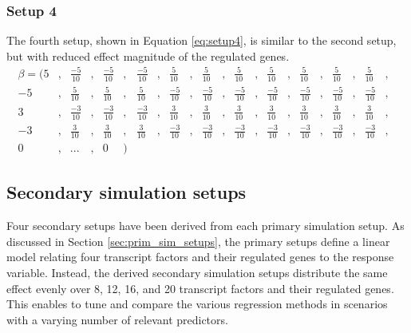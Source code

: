 \subsubsection{Setup 4}
The fourth setup, shown in Equation \ref{eq:setup4}, is similar to the second setup, but with reduced effect magnitude of the regulated genes. 
\begin{equation} \label{eq:setup4} 
\begin{aligned}
\beta = (	5&,& \frac{-5}{10}&,&  \frac{-5}{10}&,&  \frac{-5}{10}&,&  \frac{5}{10}&,&  \frac{5}{10}&,&  \frac{5}{10}&,&  \frac{5}{10}&,&  \frac{5}{10}&,&  \frac{5}{10}&,&  \frac{5}{10}&,& \\
-5&,& \frac{5}{10}&,&  \frac{5}{10}&,&  \frac{5}{10}&,&  \frac{-5}{10}&,&  \frac{-5}{10}&,&  \frac{-5}{10}&,&  \frac{-5}{10}&,&  \frac{-5}{10}&,&  \frac{-5}{10}&,&  \frac{-5}{10}&,& \\
3&,& \frac{-3}{10}&,&  \frac{-3}{10}&,&  \frac{-3}{10}&,&  \frac{3}{10}&,&  \frac{3}{10}&,&  \frac{3}{10}&,&  \frac{3}{10}&,&  \frac{3}{10}&,&  \frac{3}{10}&,&  \frac{3}{10}&,& \\
-3&,& \frac{3}{10}&,&  \frac{3}{10}&,&  \frac{3}{10}&,&  \frac{-3}{10}&,&  \frac{-3}{10}&,&  \frac{-3}{10}&,&  \frac{-3}{10}&,&  \frac{-3}{10}&,&  \frac{-3}{10}&,&  \frac{-3}{10}&,& \\
0&,& ...&,& 0&)&
\end{aligned}
\end{equation}


\subsection{Secondary simulation setups}
Four secondary setups have been derived from each primary simulation setup. As discussed in Section \ref{sec:prim_sim_setups}, the primary setups define a linear model relating four transcript factors and their regulated genes to the response variable. Instead, the derived secondary simulation setups distribute the same effect evenly over 8, 12, 16, and 20 transcript factors and their regulated genes. This enables to tune and compare the various regression methods in scenarios with a varying number of relevant predictors.